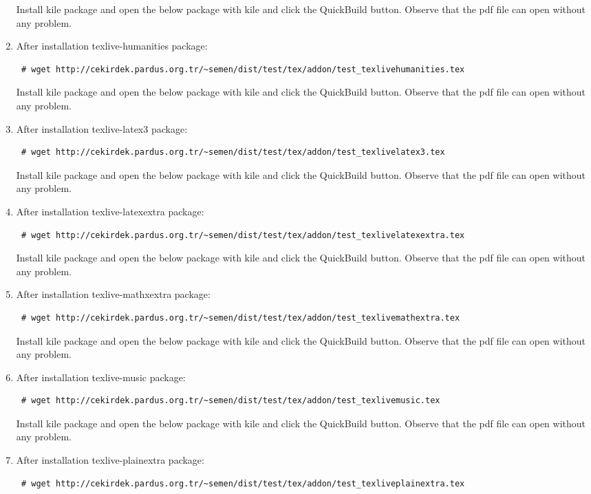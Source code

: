 \documentclass[a4paper,10pt]{article}
\begin{document}
\begin{enumerate}
Install kile package and open the below package with kile and click the QuickBuild button. Observe that the pdf file can open without any problem.

\item After installation texlive-humanities package:
\begin{verbatim}
 # wget http://cekirdek.pardus.org.tr/~semen/dist/test/tex/addon/test_texlivehumanities.tex
\end{verbatim}

Install kile package and open the below package with kile and click the QuickBuild button. Observe that the pdf file can open without any problem.

\item After installation texlive-latex3 package:
\begin{verbatim}
 # wget http://cekirdek.pardus.org.tr/~semen/dist/test/tex/addon/test_texlivelatex3.tex
\end{verbatim}

Install kile package and open the below package with kile and click the QuickBuild button. Observe that the pdf file can open without any problem.
\item After installation texlive-latexextra package:
\begin{verbatim}
 # wget http://cekirdek.pardus.org.tr/~semen/dist/test/tex/addon/test_texlivelatexextra.tex
\end{verbatim}

Install kile package and open the below package with kile and click the QuickBuild button. Observe that the pdf file can open without any problem.
\item After installation texlive-mathxextra package:
\begin{verbatim}
 # wget http://cekirdek.pardus.org.tr/~semen/dist/test/tex/addon/test_texlivemathextra.tex
\end{verbatim}

Install kile package and open the below package with kile and click the QuickBuild button. Observe that the pdf file can open without any problem.

\item After installation texlive-music package:
\begin{verbatim}
 # wget http://cekirdek.pardus.org.tr/~semen/dist/test/tex/addon/test_texlivemusic.tex
\end{verbatim}

Install kile package and open the below package with kile and click the QuickBuild button. Observe that the pdf file can open without any problem.
\item After installation texlive-plainextra package:
\begin{verbatim}
 # wget http://cekirdek.pardus.org.tr/~semen/dist/test/tex/addon/test_texliveplainextra.tex
\end{verbatim}


\end{enumerate}
\end{document}
